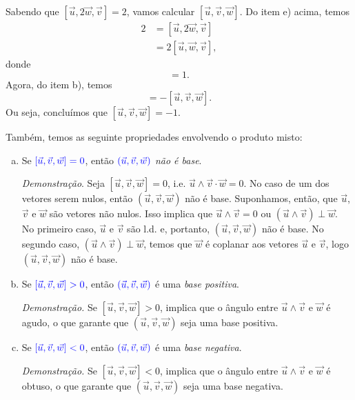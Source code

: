 \begin{ex}
  Sabendo que $[\vec{u},2\vec{w},\vec{v}] = 2$, vamos calcular $[\vec{u},\vec{v},\vec{w}]$. Do item e) acima, temos
  \begin{align}
    2 &= [\vec{u},2\vec{w},\vec{v}] \\
      &= 2[\vec{u},\vec{w},\vec{v}],
  \end{align}
  donde
  \begin{equation}
    [\vec{u},\vec{w},\vec{v}] = 1.
  \end{equation}
  Agora, do item b), temos
  \begin{equation}
    [\vec{u},\vec{w},\vec{v}] = -[\vec{u},\vec{v},\vec{w}].
  \end{equation}
  Ou seja, concluímos que $[\vec{u},\vec{v},\vec{w}] =  -1$.
\end{ex}

Também, temos as seguinte propriedades envolvendo o produto misto:
\begin{enumerate}[a)]
\item Se ${\color{blue}[\vec{u},\vec{v},\vec{w}] = 0}$, então ${\color{blue}(\vec{u},\vec{v},\vec{w})}$ \emph{não é base}.

  {\it Demonstração}. Seja $[\vec{u},\vec{v},\vec{w}]=0$, i.e. $\vec{u}\land\vec{v}\cdot\vec{w}=0$. No caso de um dos vetores serem nulos, então $(\vec{u},\vec{v},\vec{w})$ não é base. Suponhamos, então, que $\vec{u}$, $\vec{v}$ e $\vec{w}$ são vetores não nulos. Isso implica que $\vec{u}\land\vec{v}=0$ ou $(\vec{u}\land\vec{v})\perp\vec{w}$. No primeiro caso, $\vec{u}$ e $\vec{v}$ são l.d. e, portanto, $(\vec{u},\vec{v},\vec{w})$  não é base. No segundo caso, $(\vec{u}\land\vec{v})\perp\vec{w}$, temos que $\vec{w}$ é coplanar aos vetores $\vec{u}$ e $\vec{v}$, logo $(\vec{u},\vec{v},\vec{w})$ não é base.
  
\item Se ${\color{blue}[\vec{u},\vec{v},\vec{w}] > 0}$, então ${\color{blue}(\vec{u},\vec{v},\vec{w})}$ é uma \emph{base positiva}.

  {\it Demonstração.} Se $[\vec{u},\vec{v},\vec{w}] > 0$, implica que o ângulo entre $\vec{u}\land\vec{v}$ e $\vec{w}$ é agudo, o que garante que $(\vec{u},\vec{v},\vec{w})$ seja uma base positiva.
  
\item Se ${\color{blue}[\vec{u},\vec{v},\vec{w}] < 0}$, então ${\color{blue}(\vec{u},\vec{v},\vec{w})}$ é uma \emph{base negativa}.

  {\it Demonstração.} Se $[\vec{u},\vec{v},\vec{w}] < 0$, implica que o ângulo entre $\vec{u}\land\vec{v}$ e $\vec{w}$ é obtuso, o que garante que $(\vec{u},\vec{v},\vec{w})$ seja uma base negativa.
\end{enumerate}

